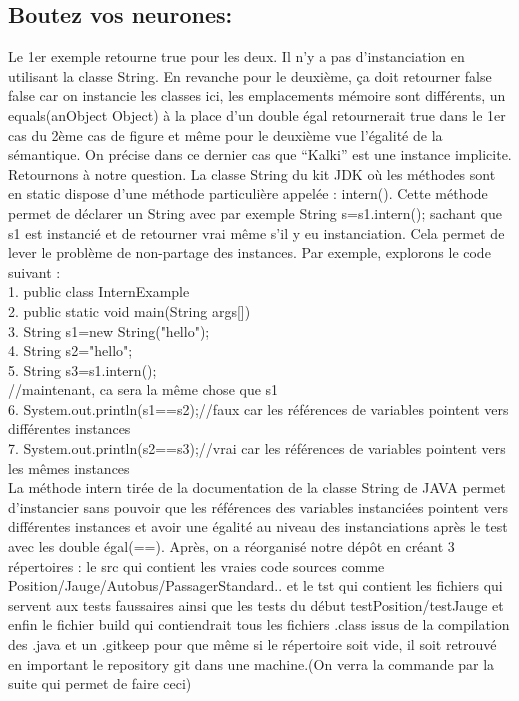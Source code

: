 \documentclass{article}
\begin{document}
\subsection{Boutez vos neurones: }
Le 1er exemple retourne true pour les deux. Il n’y a pas d’instanciation en utilisant la classe String. En revanche pour le deuxième, ça doit retourner false false car on instancie les classes ici, les emplacements mémoire sont différents, un equals(anObject Object) à la place d’un double égal retournerait true dans le 1er cas du 2ème cas de figure et même pour le deuxième vue l'égalité de la sémantique. On précise
dans ce dernier cas que “Kalki” est une instance implicite.\\

Retournons à notre question. La classe String du kit JDK où les méthodes sont en static
dispose d’une méthode particulière appelée : intern(). Cette méthode permet de déclarer un String avec par exemple String s=s1.intern(); sachant que s1 est instancié et de retourner vrai même s'il y eu instanciation. Cela permet de lever le problème de non-partage des instances. Par exemple, explorons le code suivant :\\
1. public class InternExample{\\
2. public static void main(String args[]){\\
3. String s1=new String("hello");\\
4. String s2="hello";\\
5. String s3=s1.intern();\\
//maintenant, ca sera la même chose que s1 \\
6. System.out.println(s1==s2);//faux car les références de variables pointent vers
différentes instances \\
7. System.out.println(s2==s3);//vrai car les références de variables pointent vers les
mêmes instances}} \\
La méthode intern tirée de la documentation de la classe String de JAVA permet d’instancier sans pouvoir que les références des variables instanciées pointent vers différentes instances et avoir une égalité au niveau des instanciations après le test avec les double égal(==). Après, on a réorganisé notre dépôt en créant 3 répertoires : le src qui contient les vraies code sources comme Position/Jauge/Autobus/PassagerStandard.. et le tst qui contient les fichiers qui servent aux tests faussaires ainsi que les tests du début testPosition/testJauge et enfin le fichier build qui contiendrait tous les fichiers .class issus de la compilation des .java et un .gitkeep pour que même si le répertoire soit vide, il soit retrouvé en important le repository git dans une machine.(On verra la commande par la suite qui permet de faire
ceci)
\end{document}
